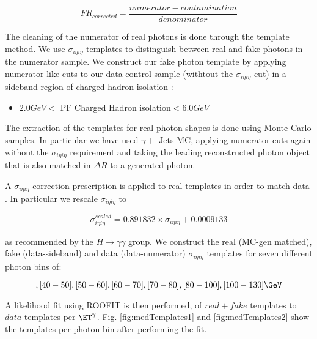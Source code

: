 \begin{equation}
FR_{corrected}=\frac{numerator-contamination}{denominator}
\end{equation}

The cleaning of the numerator of real photons is done through the template method. We use $\sigma_{i\eta i\eta}$ templates to distinguish between real and fake photons in the numerator sample. We construct our fake photon template by applying numerator like cuts to our data control sample (withtout the $\sigma_{i\eta i\eta}$ cut) in a sideband region of charged hadron isolation :

\begin{itemize}
\item $2.0 GeV <$ PF Charged Hadron isolation$<6.0 GeV$
\end{itemize}

The extraction of the templates for real photon shapes is done using Monte Carlo samples. In particular we have used $\gamma +$ Jets MC, applying numerator cuts again 
without the $\sigma_{i\eta i\eta}$ requirement and taking the leading reconstructed photon object that is also matched in $\Delta R$ to a generated photon. 



A $\sigma_{i\eta i\eta}$ correction prescription is applied to real templates in order to match data \cite{higgs2GammaAN}. 
In particular we rescale $\sigma_{i\eta i\eta}$ to 

\begin{equation}
\sigma_{i\eta i\eta}^{scaled} = 0.891832 \times \sigma_{i\eta i\eta} + 0.0009133
\label{eqn:fr}
\end{equation}

as recommended by the $H \rightarrow \gamma \gamma$ group. We construct the real (MC-gen matched), 
fake (data-sideband) and data (data-numerator) $\sigma_{i\eta i\eta}$ templates for seven different photon \et bins of:

\begin{equation}
 [30-40], [40-50], [50-60], [60-70], [70-80], [80-100], [100-130] \GeV
\end{equation}

A likelihood fit using ROOFIT is then performed, of $real + fake$ templates to $data$ templates per $\ET^{\gamma}$.
Fig. \ref{fig:medTemplates1} and \ref{fig:medTemplates2} show the templates per photon \et bin after performing the fit.

